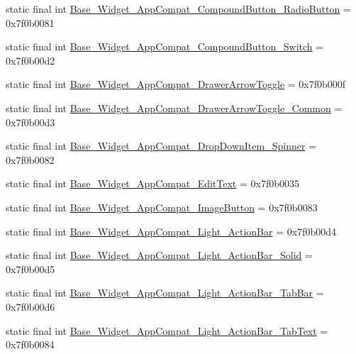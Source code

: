 \begin{CompactItemize}
static final int \hyperlink{classandroid_1_1support_1_1graphics_1_1drawable_1_1_r_1_1style_0998aaf3fbc257e0203087b30365ae1c}{Base\_\-Widget\_\-AppCompat\_\-CompoundButton\_\-RadioButton} = 0x7f0b0081
\item 
static final int \hyperlink{classandroid_1_1support_1_1graphics_1_1drawable_1_1_r_1_1style_7a618fee645d0e70502090a533145f31}{Base\_\-Widget\_\-AppCompat\_\-CompoundButton\_\-Switch} = 0x7f0b00d2
\item 
static final int \hyperlink{classandroid_1_1support_1_1graphics_1_1drawable_1_1_r_1_1style_68a8fc6f1cbac5c8b11522e79ec5df32}{Base\_\-Widget\_\-AppCompat\_\-DrawerArrowToggle} = 0x7f0b000f
\item 
static final int \hyperlink{classandroid_1_1support_1_1graphics_1_1drawable_1_1_r_1_1style_2b95f83341f3a2a8f554b0448edaa1a3}{Base\_\-Widget\_\-AppCompat\_\-DrawerArrowToggle\_\-Common} = 0x7f0b00d3
\item 
static final int \hyperlink{classandroid_1_1support_1_1graphics_1_1drawable_1_1_r_1_1style_11428b9a85cbf4eb3fe344594a9e2b40}{Base\_\-Widget\_\-AppCompat\_\-DropDownItem\_\-Spinner} = 0x7f0b0082
\item 
static final int \hyperlink{classandroid_1_1support_1_1graphics_1_1drawable_1_1_r_1_1style_ca2cc4b0a1d28aafb3eb3fef85282ab2}{Base\_\-Widget\_\-AppCompat\_\-EditText} = 0x7f0b0035
\item 
static final int \hyperlink{classandroid_1_1support_1_1graphics_1_1drawable_1_1_r_1_1style_a085ec29e35a948f63fbd46e2982ad02}{Base\_\-Widget\_\-AppCompat\_\-ImageButton} = 0x7f0b0083
\item 
static final int \hyperlink{classandroid_1_1support_1_1graphics_1_1drawable_1_1_r_1_1style_d9fb01270dfde6918d467fe662b83b17}{Base\_\-Widget\_\-AppCompat\_\-Light\_\-ActionBar} = 0x7f0b00d4
\item 
static final int \hyperlink{classandroid_1_1support_1_1graphics_1_1drawable_1_1_r_1_1style_61e32d22781754a1c91d32aa45809141}{Base\_\-Widget\_\-AppCompat\_\-Light\_\-ActionBar\_\-Solid} = 0x7f0b00d5
\item 
static final int \hyperlink{classandroid_1_1support_1_1graphics_1_1drawable_1_1_r_1_1style_0a1620773a03f6ff00b926aacffe1f0c}{Base\_\-Widget\_\-AppCompat\_\-Light\_\-ActionBar\_\-TabBar} = 0x7f0b00d6
\item 
static final int \hyperlink{classandroid_1_1support_1_1graphics_1_1drawable_1_1_r_1_1style_fffb1c95385d74881fed0500013d6219}{Base\_\-Widget\_\-AppCompat\_\-Light\_\-ActionBar\_\-TabText} = 0x7f0b0084
\item 

\end{CompactItemize}
